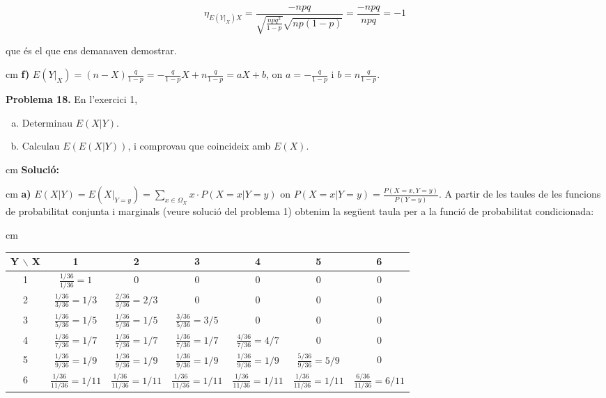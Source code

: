 \documentclass{article}
\begin{document}
\[
\eta_{E(Y|_X) X}=\frac{-npq}{\sqrt{\frac{npq^2}{1-p}} \sqrt{np(1-p)}} = \frac{-npq}{npq} = -1
\]

\noindent
que \'es el que ens demanaven demostrar.


 cm
\noindent
\textbf{f)} $E(Y|_X)=(n-X) \frac{q}{1-p}=-\frac{q}{1-p} X + n \frac{q}{1-p}=aX+b$, on $a=-\frac{q}{1-p}$
i $b=n \frac{q}{1-p}$.

\newpage
\noindent
\textbf{Problema 18.} 
En l'exercici 1,
\begin{enumerate}[a)]
\item Determinau $E(X | Y)$. 
\item Calculau $E(E(X | Y))$, i comprovau que
coincideix amb $E(X)$. 
\end{enumerate}

 cm
\noindent
\textbf{Soluci\'o:}

 cm
\noindent
\textbf{a)} $E(X | Y)=E(X|_{Y=y})=\sum_{x \in \Omega_X} x \cdot P(X=x | Y=y)$
on $P(X=x | Y=y)= \frac{P(X=x, Y=y)}{P(Y=y)}$.
A partir de les taules de les funcions de probabilitat conjunta i marginals
(veure soluci\'o del problema 1) obtenim la seg\"uent taula per a la
funci\'o de probabilitat condicionada:

 cm
\begin{center}
\begin{tabular}{c|c|c|c|c|c|c|}
Y $\backslash$ X & 1 & 2 & 3 & 4 & 5 & 6  \\ \hline
1     & $\frac{1/36}{1/36}=1$ &    0 &    0 &    0 &    0 & 0  \\ \hline
2     & $\frac{1/36}{3/36}=1/3$ & $\frac{2/36}{3/36}=2/3$ &    0 &    0 &    0 & 0  \\ \hline
3     & $\frac{1/36}{5/36}=1/5$ & $\frac{1/36}{5/36}=1/5$ & $\frac{3/36}{5/36}=3/5$ &    0 &    0 & 0  \\ \hline
4     & $\frac{1/36}{7/36}=1/7$ & $\frac{1/36}{7/36}=1/7$ & $\frac{1/36}{7/36}=1/7$ & $\frac{4/36}{7/36}=4/7$ &    0 & 0  \\ \hline
5     & $\frac{1/36}{9/36}=1/9$ & $\frac{1/36}{9/36}=1/9$ & $\frac{1/36}{9/36}=1/9$ & $\frac{1/36}{9/36}=1/9$ & $\frac{5/36}{9/36}=5/9$
 & 0  \\ \hline
6     & $\frac{1/36}{11/36}=1/11$ & $\frac{1/36}{11/36}=1/11$ & $\frac{1/36}{11/36}=1/11$ & $\frac{1/36}{11/36}=1/11$
 & $\frac{1/36}{11/36}=1/11$ & $\frac{6/36}{11/36}=6/11$  \\ \hline
\end{tabular}
\end{center}
\end{document}
